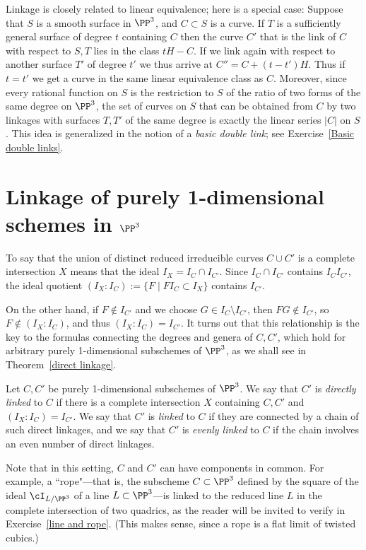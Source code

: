 \begin{remark}
Linkage is closely related to linear equivalence; here is a special case:
Suppose that $S$ is a smooth surface in $\PP^3$, and $C\subset S$ is a curve. If $T$ is a sufficiently general surface of degree $t$
containing $C$ then the curve $C'$ that is the link of $C$ with respect to $S,T$ lies in the class $tH-C$. If we link again with
respect to another surface $T'$ of degree $t'$ we thus arrive at $C'' = C+(t-t')H$. Thus if $t=t'$ we get a curve in the same 
linear equivalence class as $C$. Moreover, since every rational function on $S$ is the restriction to $S$ of the ratio of two forms of the same degree on $\PP^3$,
the set of curves on $S$ that can be obtained from $C$ by two linkages with surfaces $T, T'$ of the same degree is exactly the 
linear series $|C|$ on $S$. This idea is generalized in the notion of a \emph{basic double link}; see 
Exercise~\ref{Basic double links}.
\end{remark}

\section{Linkage of purely 1-dimensional schemes in $\PP^3$}
To say that the union of distinct reduced irreducible curves $C\cup C'$  is a complete intersection $X$ means that 
the ideal $I_X =I_C\cap I_{C'}$. Since  $I_C\cap I_{C'}$ contains $I_CI_{C'}$, the ideal quotient
$(I_X:I_C) := \{F \mid FI_C\subset I_X\}$
contains $I_{C'}$. 

On the other hand, if $F \notin I_{C'}$ and we choose $G\in I_C\setminus I_{C'}$, then $FG\notin I_{C'}$, so 
$F\notin (I_X:I_C)$, and thus
$(I_X:I_C) = I_{C'}$. It turns out that this relationship is the key to the formulas connecting the degrees and genera of $C,C'$, which hold 
for arbitrary purely 1-dimensional subschemes of $\PP^3$, as we shall see in Theorem~\ref{direct linkage}. 

\begin{definition}\label{linkage def}
Let $C,C'$ be purely 1-dimensional subschemes of $\PP^3$. We say that $C'$ is \emph{directly linked} to $C$ if there is a complete
intersection $X$ containing $C,C'$ and $(I_X:I_C) = I_{C'}$. We say that $C'$ is \emph{linked} to $C$ if they are connected by a chain of such
direct linkages, and we say that $C'$ is \emph{evenly linked} to $C$ if the chain involves an even number of direct linkages.
\end{definition}

Note that in this setting, $C$ and $C'$ can have components in common. For example, a ``rope"---that is, the subscheme $C \subset \PP^3$ defined by the square of the ideal $\cI_{L/\PP^3}$ of a line $L \subset \PP^3$---is linked to the reduced line $L$ in the complete intersection of two quadrics, as the reader will be invited to verify in Exercise~\ref{line and rope}. (This makes sense, since a rope is a flat limit of twisted cubics.)

